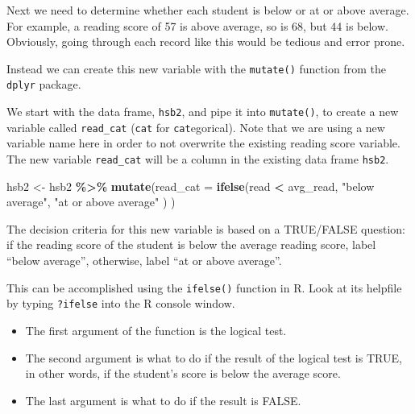 \documentclass[
  10pt,
  openany]{book}
\newenvironment{Shaded}{\begin{snugshade}}{\end{snugshade}}
\newcommand{\AttributeTok}[1]{\textcolor[rgb]{0.13,0.29,0.53}{#1}}
\newcommand{\FunctionTok}[1]{\textcolor[rgb]{0.13,0.29,0.53}{\textbf{#1}}}
\newcommand{\NormalTok}[1]{#1}
\newcommand{\OtherTok}[1]{\textcolor[rgb]{0.56,0.35,0.01}{#1}}
\newcommand{\SpecialCharTok}[1]{\textcolor[rgb]{0.81,0.36,0.00}{\textbf{#1}}}
\newcommand{\StringTok}[1]{\textcolor[rgb]{0.31,0.60,0.02}{#1}}
\theoremstyle{definition}
\theoremstyle{definition}
\theoremstyle{definition}
\theoremstyle{definition}
\theoremstyle{remark}
\begin{document}
Next we need to determine whether each student is below or at
or above average. For example, a reading score of 57 is above
average, so is 68, but 44 is below.
Obviously, going through each record like this would be tedious
and error prone.

Instead we can create this new variable with the \texttt{mutate()}
function from the \texttt{dplyr} package.

We start with the data frame, \texttt{hsb2}, and pipe it into
\texttt{mutate()}, to create a new variable called \texttt{read\_cat} (\texttt{cat} for \texttt{cat}egorical).
Note that we are using a new variable name here in order
to not overwrite the existing reading score variable.
The new variable \texttt{read\_cat} will be a column in the
existing data frame \texttt{hsb2}.

\begin{Shaded}
\begin{Highlighting}[]
\NormalTok{hsb2 }\OtherTok{\textless{}{-}}\NormalTok{ hsb2 }\SpecialCharTok{\%\textgreater{}\%} \FunctionTok{mutate}\NormalTok{(}\AttributeTok{read\_cat =} 
                          \FunctionTok{ifelse}\NormalTok{(read }\SpecialCharTok{\textless{}}\NormalTok{ avg\_read, }
                                 \StringTok{"below average"}\NormalTok{, }
                                 \StringTok{"at or above average"}
\NormalTok{                                 )}
\NormalTok{                        )}
\end{Highlighting}
\end{Shaded}

The decision criteria for this new variable is based on a
TRUE/FALSE question: if the reading score of the student
is below the average reading score, label ``below average'',
otherwise, label ``at or above average''.

This can be accomplished using the \texttt{ifelse()} function in R.
Look at its helpfile by typing \texttt{?ifelse} into the R console window.

\begin{itemize}
\item
  The first argument of the function is the logical test.
\item
  The second argument is what to do if the result of the logical test is TRUE, in other words, if the student's score is below the average score.
\item
  The last argument is what to do if the result is FALSE.
\end{itemize}
\end{document}
